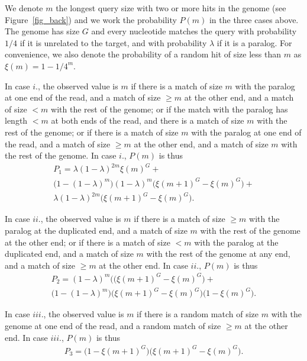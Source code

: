 \documentclass[a4,center,fleqn]{NAR}
\begin{document}
We denote $m$ the longest query size with two or more hits in the genome
(see Figure~\ref{fig_back}) and we work the probability $P(m)$ in the
three cases above. The genome has size $G$ and every nucleotide matches
the query with probability $1/4$ if it is unrelated to the target, and
with probability $\lambda$ if it is a paralog. For convenience, we also
denote the probability of a random hit of size less than $m$ as $\xi(m) =
1-1/4^m$.

In case $i.$, the observed value is $m$ if there is a match of size $m$
with the paralog at one end of the read, and a match of size $\geq m$ at
the other end, and a match of size $< m$ with the rest of the genome;
or if the match with the paralog has length $< m$ at both ends of the
read, and there is a match of size $m$ with the rest of the genome; or if
there is a match of size $m$ with the paralog at one end of the read, and
a match of size $\geq m$ at the other end, and a match of size $m$ with
the rest of the genome. In case $i.$, $P(m)$ is thus
\begin{align*}
P_1 = \lambda (1-\lambda)^{2m} \xi(m)^G + \\
\big(1-(1-\lambda)^m\big)(1-\lambda)^m \big(\xi(m+1)^G - \xi(m)^G\big) + \\
\lambda (1-\lambda)^{2m} \big(\xi(m+1)^G - \xi(m)^G\big).
\end{align*}

In case $ii.$, the observed value is $m$ if there is a match of size $\geq
m$ with the paralog at the duplicated end, and a match of size $m$ with
the rest of the genome at the other end; or if there is a match of size $<
m$ with the paralog at the duplicated end, and a match of size $m$ with
the rest of the genome at any end, and a match of size $\geq m$ at the
other end. In case $ii.$, $P(m)$ is thus
\begin{align*}
P_2 = (1-\lambda)^m \big((\xi(m+1)^G - \xi(m)^G\big) + \\
\big(1-(1-\lambda)^m\big) \big(\xi(m+1)^G - \xi(m)^G\big)
\big(1 - \xi(m)^G\big).
\end{align*}

In case $iii.$, the observed value is $m$ if there is a random match of
size $m$ with the genome at one end of the read, and a random match of
size $\geq m$ at the other end. In case $iii.$, $P(m)$ is thus
\begin{align*}
P_3 = \big(1-\xi(m+1)^G\big) \big(\xi(m+1)^G - \xi(m)^G\big).
\end{align*}
\end{document}
